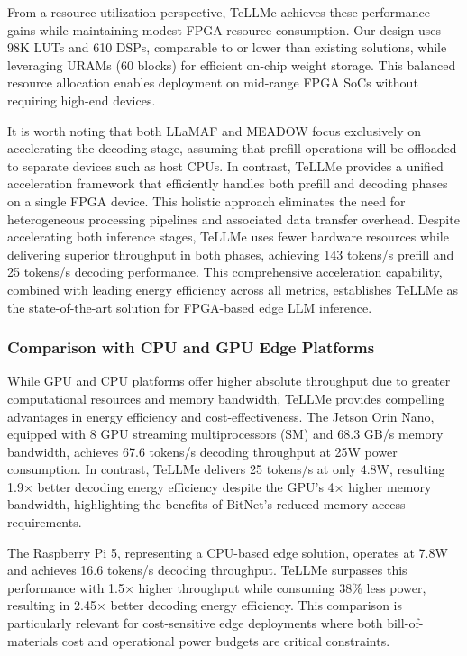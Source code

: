 \documentclass[sigconf]{acmart}
\begin{document}
From a resource utilization perspective, TeLLMe achieves these performance gains while maintaining modest FPGA resource consumption. Our design uses 98K LUTs and 610 DSPs, comparable to or lower than existing solutions, while leveraging URAMs (60 blocks) for efficient on-chip weight storage. This balanced resource allocation enables deployment on mid-range FPGA SoCs without requiring high-end devices. 

It is worth noting that both LLaMAF and MEADOW focus exclusively on accelerating the decoding stage, assuming that prefill operations will be offloaded to separate devices such as host CPUs. In contrast, TeLLMe provides a unified acceleration framework that efficiently handles both prefill and decoding phases on a single FPGA device. This holistic approach eliminates the need for heterogeneous processing pipelines and associated data transfer overhead. Despite accelerating both inference stages, TeLLMe uses fewer hardware resources while delivering superior throughput in both phases, achieving 143 tokens/s prefill and 25 tokens/s decoding performance. This comprehensive acceleration capability, combined with leading energy efficiency across all metrics, establishes TeLLMe as the state-of-the-art solution for FPGA-based edge LLM inference.

\subsubsection{Comparison with CPU and GPU Edge Platforms}
While GPU and CPU platforms offer higher absolute throughput due to greater computational resources and memory bandwidth, TeLLMe provides compelling advantages in energy efficiency and cost-effectiveness. The Jetson Orin Nano, equipped with 8 GPU streaming multiprocessors (SM) and 68.3 GB/s memory bandwidth, achieves 67.6 tokens/s decoding throughput at 25W power consumption. In contrast, TeLLMe delivers 25 tokens/s at only 4.8W, resulting 1.9$\times$ better decoding energy efficiency despite the GPU's 4$\times$ higher memory bandwidth, highlighting the benefits of BitNet's reduced memory access requirements.

The Raspberry Pi 5, representing a CPU-based edge solution, operates at 7.8W and achieves 16.6 tokens/s decoding throughput. TeLLMe surpasses this performance with 1.5$\times$ higher throughput while consuming 38\% less power, resulting in 2.45$\times$ better decoding energy efficiency. This comparison is particularly relevant for cost-sensitive edge deployments where both bill-of-materials cost and operational power budgets are critical constraints.
\end{document}
